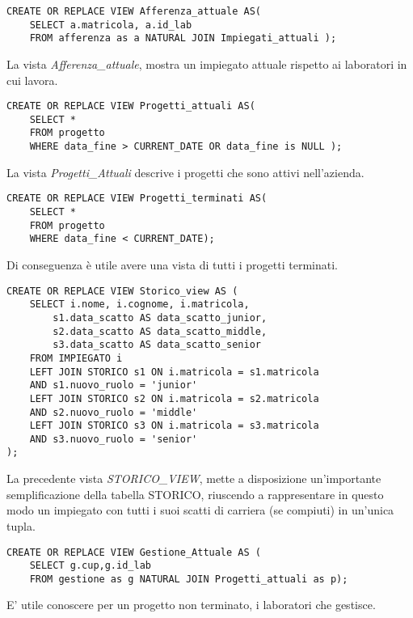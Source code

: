 \begin{itemize}
\begin{lstlisting}
CREATE OR REPLACE VIEW Afferenza_attuale AS(
    SELECT a.matricola, a.id_lab
    FROM afferenza as a NATURAL JOIN Impiegati_attuali );
\end{lstlisting}
La vista \textit{Afferenza\_attuale}, mostra un impiegato attuale rispetto ai laboratori in cui lavora.\\

\begin{lstlisting}
CREATE OR REPLACE VIEW Progetti_attuali AS(
    SELECT *
    FROM progetto
    WHERE data_fine > CURRENT_DATE OR data_fine is NULL );
\end{lstlisting}
La vista \textit{Progetti\_Attuali} descrive i progetti che sono attivi nell'azienda.\\

\begin{lstlisting}
CREATE OR REPLACE VIEW Progetti_terminati AS(
    SELECT *
    FROM progetto
    WHERE data_fine < CURRENT_DATE);
\end{lstlisting}

Di conseguenza è utile avere una vista di tutti i progetti terminati.\\
\newpage
\begin{lstlisting}
CREATE OR REPLACE VIEW Storico_view AS (
    SELECT i.nome, i.cognome, i.matricola,
        s1.data_scatto AS data_scatto_junior,
        s2.data_scatto AS data_scatto_middle,
        s3.data_scatto AS data_scatto_senior
    FROM IMPIEGATO i
    LEFT JOIN STORICO s1 ON i.matricola = s1.matricola 
    AND s1.nuovo_ruolo = 'junior'
    LEFT JOIN STORICO s2 ON i.matricola = s2.matricola 
    AND s2.nuovo_ruolo = 'middle'
    LEFT JOIN STORICO s3 ON i.matricola = s3.matricola 
    AND s3.nuovo_ruolo = 'senior'
);
\end{lstlisting}

La precedente vista \textit{STORICO\_VIEW}, mette a disposizione un'importante semplificazione della tabella STORICO, riuscendo a rappresentare in questo modo un impiegato con tutti i suoi scatti di carriera (se compiuti) in un'unica tupla.\\

\begin{lstlisting}
CREATE OR REPLACE VIEW Gestione_Attuale AS (
    SELECT g.cup,g.id_lab
    FROM gestione as g NATURAL JOIN Progetti_attuali as p);
\end{lstlisting}
E' utile conoscere per un progetto non terminato, i laboratori che gestisce.\\

\end{itemize}